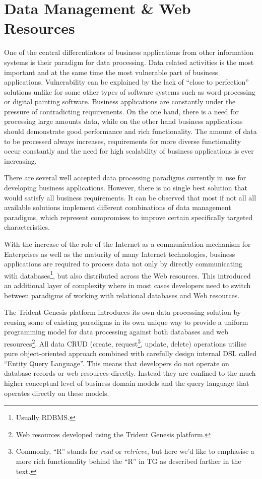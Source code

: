 \section{Data Management \& Web Resources}\label{sec:04}

  One of the central differentiators of business applications from other information systems is their paradigm for data processing.
  Data related activities is the most important and at the same time the most vulnerable part of business applications.
  Vulnerability can be explained by the lack of ``close to perfection'' solutions unlike for some other types of software systems such as word processing or digital painting software.
  Business applications are constantly under the pressure of contradicting requirements.
  On the one hand, there is a need for processing large amounts data, while on the other hand business applications should demonstrate good performance and rich functionality.
  The amount of data to be processed always increases, requirements for more diverse functionality occur constantly and the need for high scalability of business applications is ever increasing.
  
  There are several well accepted data processing paradigms currently in use for developing business applications.
  However, there is no single best solution that would satisfy all business requirements.
  It can be observed that most if not all all available solutions implement different combinations of data management paradigms, which represent compromises to improve certain specifically targeted characteristics.

  With the increase of the role of the Internet as a communication mechanism for Enterprises as well as the maturity of many Internet technologies, business applications are required to process data not only by directly communicating with databases\footnote{Usually RDBMS.}, but also distributed across the Web resources.
  This introduced an additional layer of complexity where in most cases developers need to switch between paradigms of working with relational databases and Web resources.

  The Trident Genesis platform introduces its own data processing solution by reusing some of existing paradigms in its own unique way to provide a uniform programming model for data processing against both databases and web resources\footnote{Web resources developed using the Trident Genesis platform.}.
  All data CRUD (create, request\footnote{Commonly, ``R'' stands for \emph{read} or \emph{retrieve}, but here we'd like to emphasise a more rich functionality behind the ``R'' in TG as described farther in the text.}, update, delete) operations utilise pure object-oriented approach combined with carefully design internal DSL called ``Entity Query Language''.
  This means that developers do not operate on database records or web resources directly.
  Instead they are confined to the much higher conceptual level of business domain models and the query language that operates directly on these models.
  
